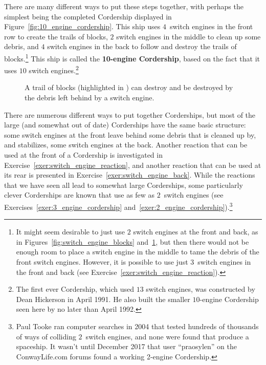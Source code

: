 There are many different ways to put these steps together, with perhaps the simplest being the completed Cordership displayed in Figure~\ref{fig:10_engine_cordership}. This ship uses $4$~switch engines in the front row to create the trails of blocks, $2$ switch engines in the middle to clean up some debris, and $4$ switch engines in the back to follow and destroy the trails of blocks.\footnote{It might seem desirable to just use $2$ switch engines at the front and back, as in Figures~\ref{fig:switch_engine_blocks} and~\ref{fig:switch_engine_blocks_destroy}, but then there would not be enough room to place a switch engine in the middle to tame the debris of the front switch engines. However, it is possible to use just $3$~switch engines in the front and back (see Exercise~\ref{exer:switch_engine_reaction}).} This ship is called the \textbf{10-engine Cordership}, based on the fact that it uses $10$ switch engines.\footnote{The first ever Cordership, which used $13$ switch engines, was constructed by Dean Hickerson in April 1991. He also built the smaller $10$-engine Cordership seen here by no later than April 1992.}

\begin{figure}[!htb]
	\centering{}
	\caption{A trail of blocks (highlighted in ) can destroy and be destroyed by the debris left behind by a switch engine.}\label{fig:switch_engine_blocks_destroy}
\end{figure}

There are numerous different ways to put together Corderships, but most of the large (and somewhat out of date) Corderships have the same basic structure: some switch engines at the front leave behind some debris that is cleaned up by, and stabilizes, some switch engines at the back. Another reaction that can be used at the front of a Cordership is investigated in Exercise~\ref{exer:switch_engine_reaction}, and another reaction that can be used at its rear is presented in Exercise~\ref{exer:switch_engine_back}. While the reactions that we have seen all lead to somewhat large Corderships, some particularly clever Corderships are known that use as few as $2$~switch engines (see Exercises~\ref{exer:3_engine_cordership} and~\ref{exer:2_engine_cordership}).\footnote{Paul Tooke ran computer searches in 2004 that tested hundreds of thousands of ways of colliding $2$~switch engines, and none were found that produce a spaceship. It wasn't until December 2017 that user ``praosylen'' on the ConwayLife.com forums found a working 2-engine Cordership.}

